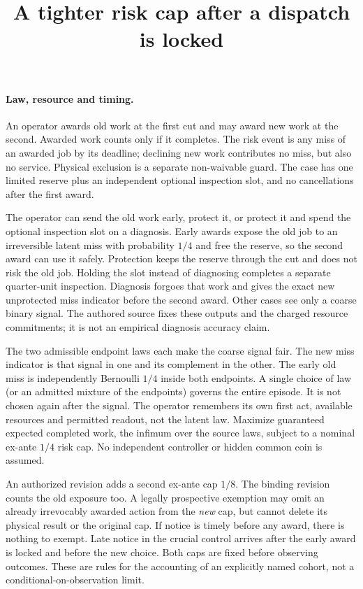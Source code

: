 \documentclass[11pt]{article}
\title{A tighter risk cap after a dispatch is locked}
\date{}
\begin{document}
\maketitle

\paragraph{Law, resource and timing.}
An operator awards old work at the first cut and may award new work at the second. Awarded work counts only if it completes. The risk event is any miss of an awarded job by its deadline; declining new work contributes no miss, but also no service. Physical exclusion is a separate non-waivable guard. The case has one limited reserve plus an independent optional inspection slot, and no cancellations after the first award.

The operator can send the old work early, protect it, or protect it and spend the optional inspection slot on a diagnosis. Early awards expose the old job to an irreversible latent miss with probability $1/4$ and free the reserve, so the second award can use it safely. Protection keeps the reserve through the cut and does not risk the old job. Holding the slot instead of diagnosing completes a separate quarter-unit inspection. Diagnosis forgoes that work and gives the exact new unprotected miss indicator before the second award. Other cases see only a coarse binary signal. The authored source fixes these outputs and the charged resource commitments; it is not an empirical diagnosis accuracy claim.

The two admissible endpoint laws each make the coarse signal fair. The new miss indicator is that signal in one and its complement in the other. The early old miss is independently Bernoulli $1/4$ inside both endpoints. A single choice of law (or an admitted mixture of the endpoints) governs the entire episode. It is not chosen again after the signal. The operator remembers its own first act, available resources and permitted readout, not the latent law. Maximize guaranteed expected completed work, the infimum over the source laws, subject to a nominal ex-ante $1/4$ risk cap. No independent controller or hidden common coin is assumed.

An authorized revision adds a second ex-ante cap $1/8$. The binding revision counts the old exposure too. A legally prospective exemption may omit an already irrevocably awarded action from the \emph{new} cap, but cannot delete its physical result or the original cap. If notice is timely before any award, there is nothing to exempt. Late notice in the crucial control arrives after the early award is locked and before the new choice. Both caps are fixed before observing outcomes. These are rules for the accounting of an explicitly named cohort, not a conditional-on-observation limit.
\end{document}
